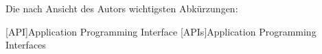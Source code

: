 \chapter*{\nameoflistofacronyms}
Die nach Ansicht des Autors wichtigsten Abkürzungen:
\bigskip

\begin{adjustwidth}{1.5em}{}
\begin{acronym}[AAAAA] %
	
	
	[API]{Application Programming Interface}
	[APIs]{Application Programming Interfaces}
	
\end{acronym}	
\end{adjustwidth}
